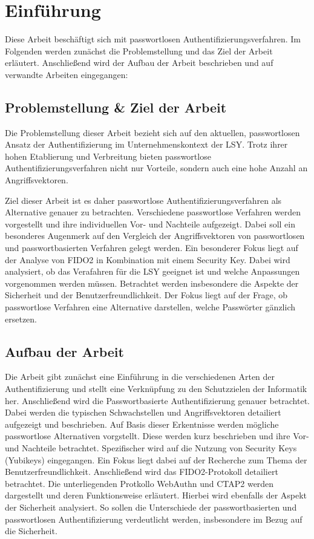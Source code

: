 \chapter{Einführung}
Diese Arbeit beschäftigt sich mit passwortlosen Authentifizierungsverfahren. Im Folgenden werden zunächst die Problemstellung und das Ziel der Arbeit erläutert. Anschließend wird der Aufbau der Arbeit beschrieben und auf verwandte Arbeiten eingegangen:

\section{Problemstellung \& Ziel der Arbeit}
Die Problemstellung dieser Arbeit bezieht sich auf den aktuellen, passwortlosen Ansatz der Authentifizierung im Unternehmenskontext der \ac{LSY}. Trotz ihrer hohen Etablierung und Verbreitung bieten passwortlose Authentifizierungsverfahren nicht nur Vorteile, sondern auch eine hohe Anzahl an Angriffsvektoren. 

Ziel dieser Arbeit ist es daher passwortlose Authentifizierungsverfahren als Alternative genauer zu betrachten. Verschiedene passwortlose Verfahren werden vorgestellt und ihre individuellen Vor- und Nachteile aufgezeigt. Dabei soll ein besonderes Augenmerk auf den Vergleich der Angriffsvektoren von passwortlosen und passwortbasierten Verfahren gelegt werden. Ein besonderer Fokus liegt auf der Analyse von FIDO2 in Kombination mit einem Security Key. Dabei wird analysiert, ob das Verafahren für die \ac{LSY} geeignet ist und welche Anpassungen vorgenommen werden müssen. Betrachtet werden insbesondere die Aspekte der Sicherheit und der Benutzerfreundlichkeit. Der Fokus liegt auf der Frage, ob passwortlose Verfahren eine Alternative darstellen, welche Passwörter gänzlich ersetzen. 

\section{Aufbau der Arbeit}
Die Arbeit gibt zunächst eine Einführung in die verschiedenen Arten der Authentifizierung und stellt eine Verknüpfung zu den Schutzzielen der Informatik her. Anschließend wird die Passwortbasierte Authentifizierung genauer betrachtet. Dabei werden die typischen Schwachstellen und Angriffsvektoren detailiert aufgezeigt und beschrieben. Auf Basis dieser Erkentnisse werden mögliche passwortlose Alternativen vorgstellt. Diese werden kurz beschrieben und ihre Vor- und Nachteile betrachtet. Spezifischer wird auf die Nutzung von Security Keys (Yubikeys) eingegangen. Ein Fokus liegt dabei auf der Recherche zum Thema der Benutzerfreundlichkeit. Anschließend wird das FIDO2-Protokoll detailiert betrachtet. Die unterliegenden Protkollo WebAuthn und CTAP2 werden dargestellt und deren Funktionsweise erläutert. Hierbei wird ebenfalls der Aspekt der Sicherheit analysiert. So sollen die Unterschiede der passwortbasierten und passwortlosen Authentifizierung verdeutlicht werden, insbesondere im Bezug auf die Sicherheit.


